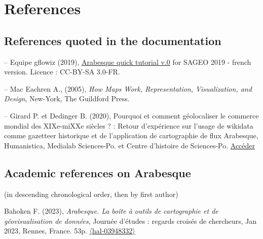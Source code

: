\documentclass[
  letterpaper,
  DIV=11,
  numbers=noendperiod]{scrreprt}
\begin{document}

\chapter*{References}\label{references}


\section*{References quoted in the
documentation}\label{references-quoted-in-the-documentation}


-- Equipe gflowiz (2019),
\href{https://github.com/gflowiz/sageo-ricardo}{Arabesque quick tutorial
v.0} for SAGEO 2019 - french version. Licence : CC-BY-SA 3.0-FR.

-- Mac Eachren A., (2005), \emph{How Maps Work, Representation,
Visualization, and Design}, New-York, The Guildford Press.

-- Girard P. et Dedinger B. (2020), Pourquoi et comment géolocaliser le
commerce mondial des XIXe-miXXe siècles ? : Retour d'expérience sur
l'usage de wikidata comme gazetteer historique et de l'application de
cartographie de flux Arabesque, Humanistica, Medialab Sciences-Po. et
Centre d'histoire de Sciences-Po.
\href{http://medialab.github.io/publications/geolocaliserRICardo@humanistica2020/}{Accéder}

\section*{\texorpdfstring{\textbf{Academic references on
Arabesque}}{Academic references on Arabesque}}\label{academic-references-on-arabesque}


(in descending chronological order, then by first author)

Bahoken F. (2023), \emph{Arabesque. La boîte à outils de cartographie et
de géovisualisation de données}, Journée d'études : regards croisés de
chercheurs, Jan 2023, Rennes, France. 53p.
\href{https://hal.science/hal-03948332}{〈hal-03948332〉}
\end{document}
